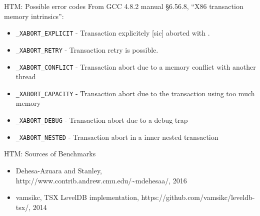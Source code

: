 \documentclass[xcolor=dvipsnames]{beamer}
\begin{document}
\begin{frame}{HTM: Possible \xabort error codes}
	From GCC 4.8.2 manual \S 6.56.8, ``X86 transaction memory intrinsics'':
	\begin{itemize}
		\item {\tt \_XABORT\_EXPLICIT} - Transaction explicitely [sic] aborted with \xabort.
		\item {\tt \_XABORT\_RETRY} - Transaction retry is possible.
		\item {\tt \_XABORT\_CONFLICT} - Transaction abort due to a memory conflict with another thread
		\item {\tt \_XABORT\_CAPACITY} - Transaction abort due to the transaction using too much memory
		\item {\tt \_XABORT\_DEBUG} - Transaction abort due to a debug trap
		\item {\tt \_XABORT\_NESTED} - Transaction abort in a inner nested transaction
	\end{itemize}
\end{frame}



\begin{frame}{HTM: Sources of Benchmarks}
	\begin{itemize}
		\item Dehesa-Azuara and Stanley, http://www.contrib.andrew.cmu.edu/\textasciitilde{}mdehesaa/, 2016
		\item vamsikc, TSX LevelDB implementation, https://github.com/vamsikc/leveldb-tsx/, 2014
	\end{itemize}
\end{frame}
\end{document}
